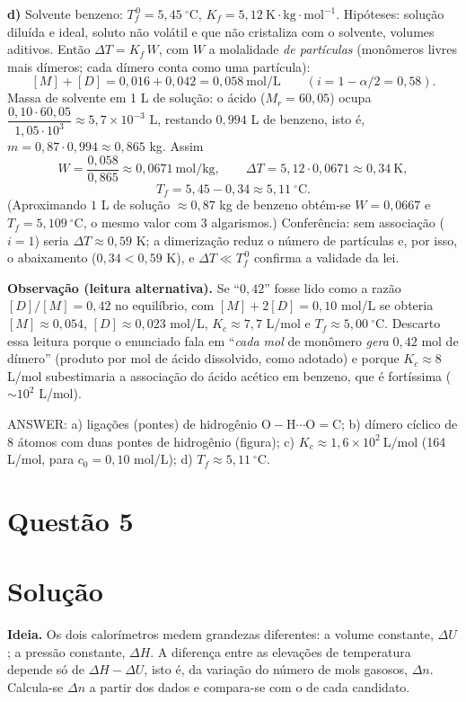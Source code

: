 \documentclass{article}%
\begin{document}
\textbf{d)} Solvente benzeno: $T_f^{\,0}=5{,}45\ ^\circ\mathrm{C}$, $K_f=5{,}12\ \mathrm{K\cdot kg\cdot mol^{-1}}$. Hipóteses: solução diluída e ideal, soluto não volátil e que não cristaliza com o solvente, volumes aditivos. Então $\Delta T=K_f\,W$, com $W$ a molalidade \emph{de partículas} (monômeros livres mais dímeros; cada dímero conta como uma partícula):
\[
[M]+[D]=0{,}016+0{,}042=0{,}058\ \text{mol/L}\qquad(i=1-\alpha/2=0{,}58).
\]
Massa de solvente em 1 L de solução: o ácido ($M_r=60{,}05$) ocupa $\dfrac{0{,}10\cdot 60{,}05}{1{,}05\cdot 10^{3}}\approx 5{,}7\times10^{-3}$ L, restando $0{,}994$ L de benzeno, isto é, $m=0{,}87\cdot0{,}994\approx0{,}865$ kg. Assim
\[
W=\frac{0{,}058}{0{,}865}\approx 0{,}0671\ \text{mol/kg},\qquad
\Delta T=5{,}12\cdot 0{,}0671\approx 0{,}34\ \text{K},
\]
\[
T_f=5{,}45-0{,}34\approx 5{,}11\ ^\circ\mathrm{C}.
\]
(Aproximando $1$ L de solução $\approx 0{,}87$ kg de benzeno obtém-se $W=0{,}0667$ e $T_f=5{,}109\ ^\circ$C, o mesmo valor com 3 algarismos.) Conferência: sem associação ($i=1$) seria $\Delta T\approx0{,}59$ K; a dimerização reduz o número de partículas e, por isso, o abaixamento ($0{,}34<0{,}59$ K), e $\Delta T\ll T_f^{\,0}$ confirma a validade da lei.

\textbf{Observação (leitura alternativa).} Se ``$0{,}42$'' fosse lido como a razão $[D]/[M]=0{,}42$ no equilíbrio, com $[M]+2[D]=0{,}10$ mol/L se obteria $[M]\approx0{,}054$, $[D]\approx0{,}023$ mol/L, $K_c\approx7{,}7$ L/mol e $T_f\approx5{,}00\ ^\circ$C. Descarto essa leitura porque o enunciado fala em ``\emph{cada mol} de monômero \emph{gera} $0{,}42$ mol de dímero'' (produto por mol de ácido dissolvido, como adotado) e porque $K_c\approx 8$ L/mol subestimaria a associação do ácido acético em benzeno, que é fortíssima ($\sim10^2$ L/mol).

\medskip
\noindent ANSWER: a) ligações (pontes) de hidrogênio $\mathrm{O{-}H\cdots O{=}C}$; b) dímero cíclico de 8 átomos com duas pontes de hidrogênio (figura); c) $K_c\approx 1{,}6\times10^{2}\ \text{L/mol}$ (164 L/mol, para $c_0=0{,}10$ mol/L); d) $T_f\approx 5{,}11\ ^\circ\mathrm{C}$.%
\newpage%
\section*{Questão 5}

\section*{Solução}

\textbf{Ideia.} Os dois calorímetros medem grandezas diferentes: a volume constante, $\Delta U$; a pressão constante, $\Delta H$. A diferença entre as elevações de temperatura depende só de $\Delta H-\Delta U$, isto é, da variação do número de mols gasosos, $\Delta n$. Calcula-se $\Delta n$ a partir dos dados e compara-se com o de cada candidato.
\end{document}
